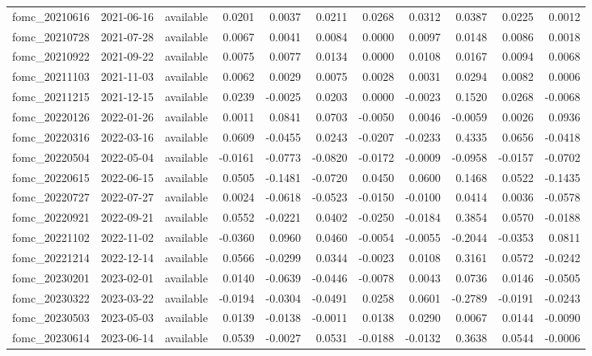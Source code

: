 \begin{tabular}{lllrrrrrrrr}
fomc_20210616 & 2021-06-16 & available & 0.0201 & 0.0037 & 0.0211 & 0.0268 & 0.0312 & 0.0387 & 0.0225 & 0.0012 \\
fomc_20210728 & 2021-07-28 & available & 0.0067 & 0.0041 & 0.0084 & 0.0000 & 0.0097 & 0.0148 & 0.0086 & 0.0018 \\
fomc_20210922 & 2021-09-22 & available & 0.0075 & 0.0077 & 0.0134 & 0.0000 & 0.0108 & 0.0167 & 0.0094 & 0.0068 \\
fomc_20211103 & 2021-11-03 & available & 0.0062 & 0.0029 & 0.0075 & 0.0028 & 0.0031 & 0.0294 & 0.0082 & 0.0006 \\
fomc_20211215 & 2021-12-15 & available & 0.0239 & -0.0025 & 0.0203 & 0.0000 & -0.0023 & 0.1520 & 0.0268 & -0.0068 \\
fomc_20220126 & 2022-01-26 & available & 0.0011 & 0.0841 & 0.0703 & -0.0050 & 0.0046 & -0.0059 & 0.0026 & 0.0936 \\
fomc_20220316 & 2022-03-16 & available & 0.0609 & -0.0455 & 0.0243 & -0.0207 & -0.0233 & 0.4335 & 0.0656 & -0.0418 \\
fomc_20220504 & 2022-05-04 & available & -0.0161 & -0.0773 & -0.0820 & -0.0172 & -0.0009 & -0.0958 & -0.0157 & -0.0702 \\
fomc_20220615 & 2022-06-15 & available & 0.0505 & -0.1481 & -0.0720 & 0.0450 & 0.0600 & 0.1468 & 0.0522 & -0.1435 \\
fomc_20220727 & 2022-07-27 & available & 0.0024 & -0.0618 & -0.0523 & -0.0150 & -0.0100 & 0.0414 & 0.0036 & -0.0578 \\
fomc_20220921 & 2022-09-21 & available & 0.0552 & -0.0221 & 0.0402 & -0.0250 & -0.0184 & 0.3854 & 0.0570 & -0.0188 \\
fomc_20221102 & 2022-11-02 & available & -0.0360 & 0.0960 & 0.0460 & -0.0054 & -0.0055 & -0.2044 & -0.0353 & 0.0811 \\
fomc_20221214 & 2022-12-14 & available & 0.0566 & -0.0299 & 0.0344 & -0.0023 & 0.0108 & 0.3161 & 0.0572 & -0.0242 \\
fomc_20230201 & 2023-02-01 & available & 0.0140 & -0.0639 & -0.0446 & -0.0078 & 0.0043 & 0.0736 & 0.0146 & -0.0505 \\
fomc_20230322 & 2023-03-22 & available & -0.0194 & -0.0304 & -0.0491 & 0.0258 & 0.0601 & -0.2789 & -0.0191 & -0.0243 \\
fomc_20230503 & 2023-05-03 & available & 0.0139 & -0.0138 & -0.0011 & 0.0138 & 0.0290 & 0.0067 & 0.0144 & -0.0090 \\
fomc_20230614 & 2023-06-14 & available & 0.0539 & -0.0027 & 0.0531 & -0.0188 & -0.0132 & 0.3638 & 0.0544 & -0.0006 \\

\end{tabular}
